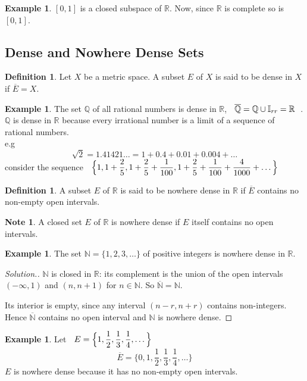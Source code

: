 \documentclass[11pt,a4paper]{article}
\theoremstyle{definition}
\newtheorem{defn}[thm]{Definition}
\newtheorem{exa}[thm]{Example}
\newtheorem*{note}{Note}
\newenvironment{solution}
  {\renewcommand{\qedsymbol}{}\begin{proof}[\textit{Solution}.]}
  {\end{proof}}
\begin{document}
 
\begin{exa}
$[0,1]$ is a closed subspace of $\mathbb{R}$. Now, since $\mathbb{R}$ is complete so is $[0,1]$.

\end{exa}


\subsection{Dense and Nowhere Dense Sets}

\begin{defn}
Let $X$ be a metric space. A subset $E$ of $X$ is said to be dense in $X$ if $\overline{E}=X$.

\end{defn}


\begin{exa}
The set $\mathbb{Q}$ of all rational numbers is dense in $\mathbb{R}$, $\hspace{0.2cm}\overline{\mathbb{Q}}=\mathbb{Q}\cup \mathbb{I}_{rr}=\mathbb{R}\hspace{0.2cm}$.  $\mathbb{Q}$ is dense in $\mathbb{R}$ because every irrational number is a limit of a sequence of rational numbers.\\ e.g$$\sqrt{2}=1.41421\dots=1+0.4+0.01+0.004+\dots$$ consider the sequence $\hspace{0.2cm}\displaystyle{\Big\{1,1+\frac{2}{5},1+\frac{2}{5}+\frac{1}{100},1+\frac{2}{5}+\frac{1}{100}+\frac{4}{1000}+\dots\Big\}}$
\end{exa}


\begin{defn}
A subset $E$ of $\mathbb{R}$ is said to be nowhere dense in $\mathbb{R}$ if $\overline{E}$ contains no non-empty open intervals.

\begin{note}
A closed set $E$ of $\mathbb{R}$ is nowhere dense if $E$ itself contains no open intervals.
\end{note}

\end{defn}


\begin{exa}
The set $\mathbb{N}=\{1,2,3,\dots\}$ of positive integers is nowhere dense in $\mathbb{R}$.
\end{exa}

\begin{solution}
$\mathbb{N}$ is closed in $\mathbb{R}$: its complement is the union of the open intervals $(-\infty,1)$ and $(n,n+1)$ for $n\in\mathbb{N}$. So $\overline{\mathbb{N}}=\mathbb{N}$.

Its interior is empty, since any interval $(n-r,n+r)$ contains non-integers. Hence $\overline{\mathbb{N}}$ contains no open interval and $\mathbb{N}$ is nowhere dense.
\end{solution}
\begin{exa}
Let $\hspace{0.2cm}E=\Big\{1,\dfrac{1}{2},\dfrac{1}{3},\dfrac{1}{4},\dots\Big\}$ $$\overline{E}=\Big\{0,1,\frac{1}{2},\frac{1}{3},\frac{1}{4},\dots\Big\}$$ $E$ is nowhere dense because it has no  non-empty open intervals.
\end{exa}
\end{document}
